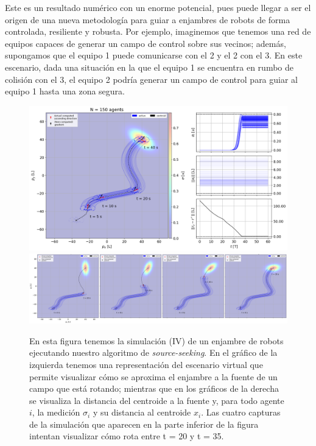 Este es un resultado numérico con un enorme potencial, pues puede llegar a ser el origen de una nueva metodología para guiar a enjambres de robots de forma controlada, resiliente y robusta. Por ejemplo, imaginemos que tenemos una red de equipos capaces de generar un campo de control sobre sus vecinos; además, supongamos que el equipo 1 puede comunicarse con el 2 y el 2 con el 3. En este escenario, dada una situación en la que el equipo 1 se encuentra en rumbo de colisión con el 3, el equipo 2 podría generar un campo de control para guiar al equipo 1 hasta una zona segura.

\begin{figure}[!h]
\centering
\includegraphics[trim={0cm 0.0cm 0cm 0.0cm}, clip, width=1\columnwidth]{./fig/ss_sim4.png}
\includegraphics[trim={0cm 0.0cm 0cm 0.0cm}, clip, width=1\columnwidth]{./fig/ss_sim4_rot.png}
\caption{En esta figura tenemos la simulación (IV) de un enjambre de robots ejecutando nuestro algoritmo de \textit{source-seeking}. En el gráfico de la izquierda tenemos una representación del escenario virtual que permite visualizar cómo se aproxima el enjambre a la fuente de un campo que está rotando; mientras que en los gráficos de la derecha se visualiza la distancia del centroide a la fuente y, para todo agente $i$, la medición $\sigma_i$ y su distancia al centroide $x_i$. Las cuatro capturas de la simulación que aparecen en la parte inferior de la figura intentan visualizar cómo rota entre t = 20 y t = 35.}
\label{fig: ss_sim4}
\end{figure}

